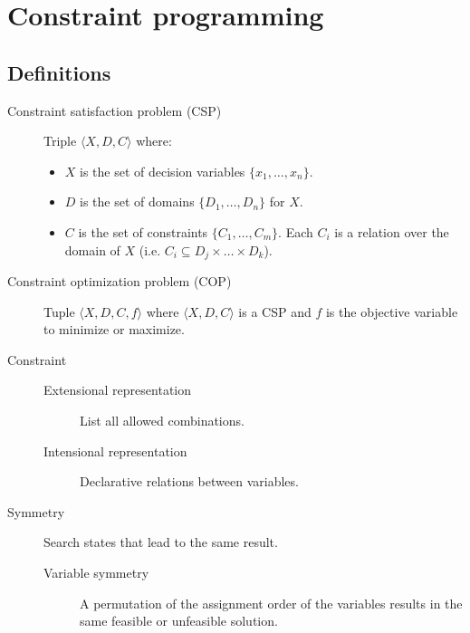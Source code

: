 \chapter{Constraint programming}



\section{Definitions}


\begin{description}
    \item[Constraint satisfaction problem (CSP)] 
        Triple $\langle X, D, C \rangle$ where:
        \begin{itemize}
            \item $X$ is the set of decision variables $\{ x_1, \dots, x_n \}$.
            \item $D$ is the set of domains $\{ D_1, \dots, D_n \}$ for $X$.
            \item $C$ is the set of constraints $\{ C_1, \dots, C_m \}$.
                Each $C_i$ is a relation over the domain of $X$ (i.e. $C_i \subseteq D_j \times \dots \times D_k$).
        \end{itemize}


    \item[Constraint optimization problem (COP)] 
        Tuple $\langle X, D, C, f \rangle$ where $\langle X, D, C \rangle$ is a CSP and 
        $f$ is the objective variable to minimize or maximize.


    \item[Constraint] 
        \phantom{}
        \begin{description}
            \item[Extensional representation] List all allowed combinations. 
            \item[Intensional representation] Declarative relations between variables.
        \end{description}


    \item[Symmetry] \marginnote{}
        Search states that lead to the same result.    

        \begin{description}
            \item[Variable symmetry] 
                A permutation of the assignment order of the variables results in the same feasible or unfeasible solution.


\end{description}
\end{description}
